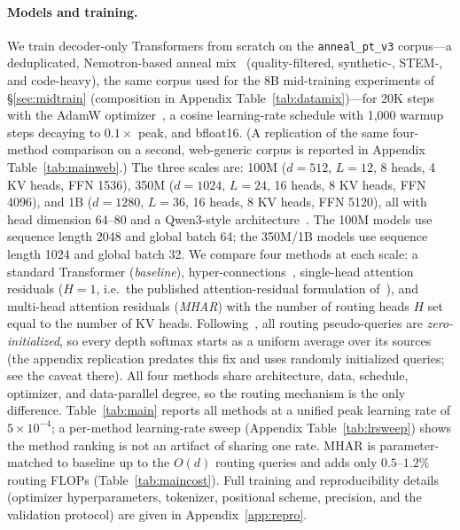 \documentclass{article}
\begin{document}
\paragraph{Models and training.} We train decoder-only Transformers from scratch on
the \texttt{anneal\_pt\_v3} corpus---a deduplicated, Nemotron-based anneal
mix~\citep{nvidia2025nemotronccv2} (quality-filtered, synthetic-, STEM-, and
code-heavy), the same corpus used for the 8B mid-training experiments of
\S\ref{sec:midtrain} (composition in Appendix Table~\ref{tab:datamix})---for
20K steps with the AdamW
optimizer~\citep{loshchilov2019adamw}, a cosine learning-rate schedule with
1{,}000 warmup steps decaying to $0.1\times$ peak, and bfloat16. (A replication of the same
four-method comparison on a second, web-generic corpus is
reported in Appendix Table~\ref{tab:mainweb}.) The three scales
are: 100M ($d{=}512$, $L{=}12$, 8 heads, 4 KV heads, FFN 1536), 350M
($d{=}1024$, $L{=}24$, 16 heads, 8 KV heads, FFN 4096), and 1B ($d{=}1280$,
$L{=}36$, 16 heads, 8 KV heads, FFN 5120), all with head dimension 64--80 and a
Qwen3-style architecture~\citep{qwen2025qwen3}. The 100M models use sequence
length 2048 and global batch 64; the 350M/1B models use sequence length 1024 and
global batch 32. We compare four methods at each scale: a standard Transformer
(\emph{baseline}), hyper-connections~\citep{zhu2024hyperconnections}, single-head
attention residuals ($H{=}1$, i.e.\ the published attention-residual
formulation of~\citet{kimi2025attention}), and multi-head attention residuals
(\emph{MHAR}) with the number of routing heads $H$ set equal to the number of
KV heads. Following~\citet{kimi2025attention}, all routing pseudo-queries are
\emph{zero-initialized}, so every depth softmax starts as a uniform average
over its sources (the appendix replication predates this fix and uses randomly
initialized queries; see the caveat there). All four methods share architecture,
data, schedule, optimizer, and data-parallel degree,
so the routing mechanism is the only difference. Table~\ref{tab:main} reports all
methods at a unified peak learning rate of $5\times10^{-4}$; a per-method
learning-rate sweep (Appendix Table~\ref{tab:lrsweep}) shows the
method ranking is not an artifact of sharing one rate. MHAR is
parameter-matched to baseline up to the $O(d)$ routing queries and adds only
$0.5$--$1.2\%$ routing FLOPs (Table~\ref{tab:maincost}). Full training and reproducibility details (optimizer
hyperparameters, tokenizer, positional scheme, precision, and the validation
protocol) are given in Appendix~\ref{app:repro}.
\end{document}
